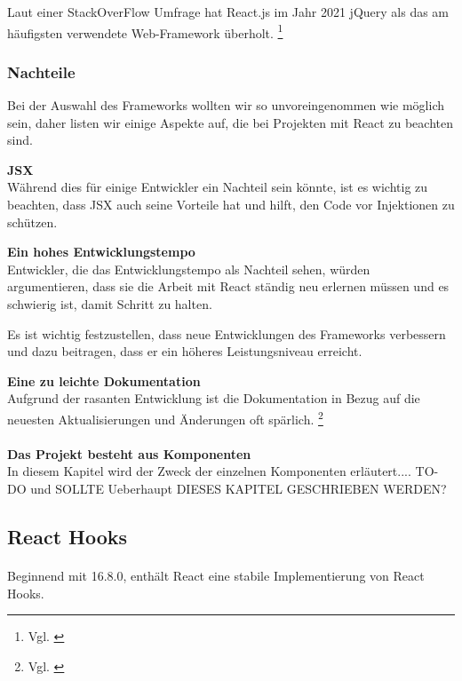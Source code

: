 Laut einer StackOverFlow Umfrage hat React.js im Jahr 2021 jQuery als das am häufigsten verwendete Web-Framework überholt.
\footnote{ Vgl. \cite{SO01}}
\newpage

\subsubsection{Nachteile}
Bei der Auswahl des Frameworks wollten wir so unvoreingenommen wie möglich sein, daher listen wir einige Aspekte auf, die bei Projekten mit React zu beachten sind.
\newline

\textbf{JSX}\\
Während dies für einige Entwickler ein Nachteil sein könnte, ist es wichtig zu beachten, dass JSX auch seine Vorteile hat und hilft, den Code vor Injektionen zu schützen.
\newline

\textbf{Ein hohes Entwicklungstempo}\\
Entwickler, die das Entwicklungstempo als Nachteil sehen, würden argumentieren, dass sie die Arbeit mit React ständig neu erlernen müssen und es schwierig ist, damit Schritt zu halten.

Es ist wichtig festzustellen, dass neue Entwicklungen des Frameworks verbessern und dazu beitragen, dass er ein höheres Leistungsniveau erreicht. 
\newline

\textbf{Eine zu leichte Dokumentation}\\
Aufgrund der rasanten Entwicklung ist die Dokumentation in Bezug auf die neuesten Aktualisierungen und Änderungen oft spärlich. 
\footnote{ Vgl. \cite{R01}}

\paragraph{}
\textbf{Das Projekt besteht aus Komponenten}\\
In diesem Kapitel wird der Zweck der einzelnen Komponenten erläutert....
TO-DO und SOLLTE Ueberhaupt DIESES KAPITEL GESCHRIEBEN WERDEN?

\subsection{React Hooks}
\paragraph{}
Beginnend mit 16.8.0, enthält React eine stabile Implementierung von React Hooks.

